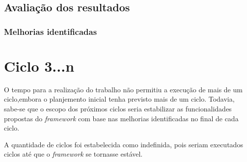  
  \section{Avaliação dos resultados}
  
    \subsection{Melhorias identificadas}
    
\chapter{Ciclo 3...n}
  
  O tempo para a realização do trabalho não permitiu a execução de mais de um
  ciclo,embora o planjemento inicial tenha previsto mais de um ciclo. Todavia, sabe-se que o escopo dos próximos
  ciclos seria estabilizar as funcionalidades propostas do \textit{framework} com base nas melhorias identificadas
  no final de cada ciclo.
  
  A quantidade de ciclos foi estabelecida como indefinida, pois seriam executados
  ciclos até que o \textit{framework} se tornasse estável.
  